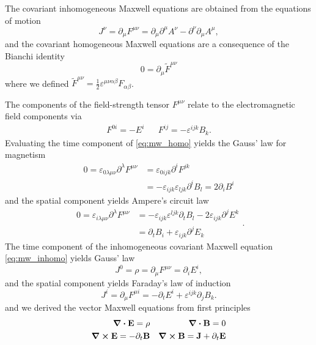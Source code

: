 The covariant inhomogeneous Maxwell equations are obtained from the equations of motion
\begin{equation}
	J^\nu
	=
	\partial_\mu F^{\mu\nu}
	=
	\partial_\mu\partial^\mu A^\nu
	-
	\partial^\nu\partial_\mu A^\mu
	\label{eq:mw_inhomo},
\end{equation}
and the covariant homogeneous Maxwell equations are a consequence of the Bianchi identity
\begin{equation}
	0
	=
	\partial_\mu\tilde{F}^{\mu\nu}
	\label{eq:mw_homo}
\end{equation}
where we defined $\tilde{F}^{\mu\nu}=\frac{1}{2}\varepsilon^{\mu\nu\alpha\beta}F_{\alpha\beta}$.

The components of the field-strength tensor $F^{\mu\nu}$ relate to the electromagnetic field components via
\begin{align}
	F^{0i}
	=
	-E^i
	&&
	F^{ij}
	=
	-\varepsilon^{ijk}B_k
	\label{eq:mw_field_strength_components}.
\end{align}
Evaluating the time component of \cref{eq:mw_homo} yields the Gauss' law for magnetism
\begin{equation}
	\begin{split}
		0
		=
		\varepsilon_{0\lambda\mu\nu}\partial^\lambda F^{\mu\nu}
		&=
		\varepsilon_{0ijk}\partial^iF^{jk}
		\\
		&=
		-
		\varepsilon_{ijk}\varepsilon_{ljk}
		\partial^i B_l
		=
		2\partial_iB^i
	\end{split}
	\label{eq:mw_gauss_law_mag}
\end{equation}
and the spatial component yields Ampere's circuit law
\begin{equation}
	\begin{split}
		0
		=
		\varepsilon_{i\lambda\mu\nu}
		\partial^\lambda
		F^{\mu\nu}
		&=
		-
		\varepsilon_{ijk}
		\varepsilon^{ljk}
		\partial_t B_l
		-
		2\varepsilon_{ijk}
		\partial^jE^k
		\\
		&=
		\partial_tB_i
		+
		\varepsilon_{ijk}
		\partial^jE_k
	\end{split}
	\label{eq:mw_ampere_law}.
\end{equation}
The time component of the inhomogeneous covariant Maxwell equation \cref{eq:mw_inhomo} yields Gauss' law
\begin{equation}
	J^0
	=
	\rho
	=
	\partial_\mu F^{\mu\nu}
	=
	\partial_i E^i
	\label{eq:mw_gauss_law},
\end{equation}
and the spatial component yields Faraday's law of induction
\begin{equation}
	J^i
	=
	\partial_\mu F^{\mu i}
	=
	-\partial_t E^i
	+\varepsilon^{ijk}\partial_j B_k
	\label{eq:mw_faraday_law}.
\end{equation}
and we derived the vector Maxwell equations from first principles
\begin{align}
	\div\vb{E}
	=
	\rho
	&&
	\div\vb{B}
	=
	0
	\label{eq:mw_homo_vec}
	\\
	\curl\vb{E}
	=
	-
	\partial_t\vb{B}
	&&
	\curl\vb{B}
	=
	\vb{J}
	+
	\partial_t\vb{E}
	\label{eq:mw_inhomo_vec}
\end{align}

